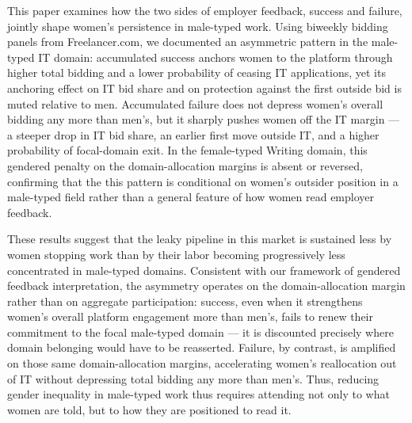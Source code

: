 \documentclass[12pt]{article}
\begin{document}
This paper examines how the two sides of employer feedback, success and failure, jointly shape women's persistence in male-typed work. Using biweekly bidding panels from Freelancer.com, we documented an asymmetric pattern in the male-typed IT domain: accumulated success anchors women to the platform through higher total bidding and a lower probability of ceasing IT applications, yet its anchoring effect on IT bid share and on protection against the first outside bid is muted relative to men. Accumulated failure does not depress women's overall bidding any more than men's, but it sharply pushes women off the IT margin --- a steeper drop in IT bid share, an earlier first move outside IT, and a higher probability of focal-domain exit. In the female-typed Writing domain, this gendered penalty on the domain-allocation margins is absent or reversed, confirming that the this pattern is conditional on women's outsider position in a male-typed field rather than a general feature of how women read employer feedback.

These results suggest that the leaky pipeline in this market is sustained less by women stopping work than by their labor becoming progressively less concentrated in male-typed domains. Consistent with our framework of gendered feedback interpretation, the asymmetry operates on the domain-allocation margin rather than on aggregate participation: success, even when it strengthens women's overall platform engagement more than men's, fails to renew their commitment to the focal male-typed domain --- it is discounted precisely where domain belonging would have to be reasserted. Failure, by contrast, is amplified on those same domain-allocation margins, accelerating women's reallocation out of IT without depressing total bidding any more than men's. Thus, reducing gender inequality in male-typed work thus requires attending not only to what women are told, but to how they are positioned to read it.


\newpage



\end{document}
